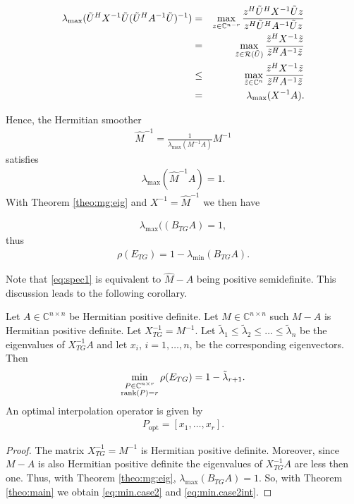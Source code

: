 \documentclass[final]{siamltex}
\newcommand{\innCnmr}{\in\mathbb{C}^{n-r}}
\newcommand{\beqo}{\begin{eqnarray*}}
\newcommand{\beq}{\begin{eqnarray}}
\newcommand{\eeqo}{\end{eqnarray*}}
\newcommand{\eeq}{\end{eqnarray}}
\numberwithin{equation}{section}
\newcommand{\ran} {{\cal R}}
\newcommand{\bCn}{\mathbb{C}^n}
\newcommand{\Cnr}{\mathbb{C}^{n \times r}}
\newcommand{\inCnn}{\in \mathbb{C}^{n \times n}}
\begin{document}
\beqo
\lambda_{\max}(\tilde U^HX^{-1}\tilde U (\tilde U^HA^{-1}\tilde
U)^{-1})
& = &  \max_{z \innCnmr} \frac{z^H\tilde U^HX^{-1}\tilde Uz}{ z^H\tilde
U^HA^{-1}\tilde Uz}\\
& = &  \max_{\tilde z \in {\ran (\tilde U)} } \frac{\tilde z^HX^{-1}\tilde z}{
\tilde z^HA^{-1}\tilde z}\\
& \leq &\max_{\tilde z \in \bCn  } \frac{\tilde z^HX^{-1}\tilde z}{
\tilde z^HA^{-1}\tilde z}\\
& = & \lambda_{\max}(X^{-1}A).
\eeqo

Hence, the  Hermitian smoother
\beqo
\hat M^{-1} = \frac{1}{\lambda_{\max}(M^{-1}A)}M^{-1}
\eeqo
satisfies
\beq \label{eq:spec1}
\lambda_{\max}(\hat M^{-1}A) = 1.
\eeq
With Theorem \ref{theo:mg:eig} and $X^{-1} = \hat M^{-1}$ we then have 

\beqo
\lambda_{\max} ((B_{TG}A) = 1,
\eeqo
thus
\beqo
\rho(E_{TG}) = 1 - \lambda_{\min } (B_{TG}A).
\eeqo

Note that \eqref{eq:spec1} is equivalent to  $\hat M - A $ being positive
semidefinite. This discussion leads to the following corollary.
\begin{corollary} \label{coro:two}
Let  $A\inCnn$  be Hermitian positive definite. Let $ M \inCnn$ such $M - A$ is
Hermitian positive definite.
Let $X_{TG}^{-1} =  M^{-1}$.   
 Let $
\tilde \lambda_1 \leq \tilde \lambda_2 \leq \ldots \leq  \tilde \lambda_n $
be the  eigenvalues of $X_{TG}^{-1}A$  and let $x_i$, $i = 1, \ldots, n$, be
the corresponding eigenvectors. Then
\beq \label{eq:min.case2}
\min_{\substack{P \in \Cnr \\ \rank(P)=r}}\rho(E_{TG}) = 1 - \tilde
\lambda_{r+1}.
\eeq
An optimal interpolation operator is given by 
\beq  \label{eq:min.case2int}
P_{\mathrm{opt}} = [x_{1}, \ldots , x_r].
\eeq
\end{corollary}
\begin{proof}
The matrix $X_{TG}^{-1} = M^{-1}$ is Hermitian positive definite. Moreover,
since $M - A$ is also Hermitian positive definite the eigenvalues of
$X_{TG}^{-1}A$ are less then  one. Thus, with Theorem \ref{theo:mg:eig},
$\lambda_{\max}(B_{TG}A) = 1$.  So, with  Theorem \ref{theo:main}  we obtain
\eqref{eq:min.case2} and \eqref{eq:min.case2int}.
\end{proof}
\end{document}
